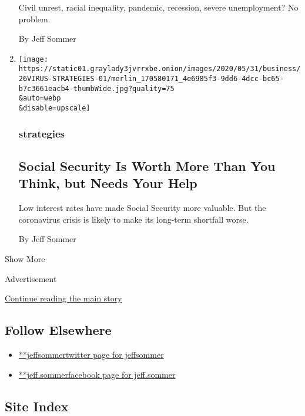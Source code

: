 \begin{enumerate}
  Civil unrest, racial inequality, pandemic, recession, severe
  unemployment? No problem.

  By Jeff Sommer
\item
  \href{/2020/05/29/business/Social-Security-benefits-shortfall-coronavirus.html}{}

  \texttt{[image: https://static01.graylady3jvrrxbe.onion/images/2020/05/31/business/26VIRUS-STRATEGIES-01/merlin\_170580171\_4e6985f3-9dd6-4dcc-bc65-b7c3661eacb4-thumbWide.jpg?quality=75\\\&auto=webp\\\&disable=upscale]}

  \hypertarget{strategies-8}{%
  \subsubsection{strategies}\label{strategies-8}}

  \hypertarget{social-security-is-worth-more-than-you-think-but-needs-your-help}{%
  \subsection{Social Security Is Worth More Than You Think, but Needs
  Your
  Help}\label{social-security-is-worth-more-than-you-think-but-needs-your-help}}

  Low interest rates have made Social Security more valuable. But the
  coronavirus crisis is likely to make its long-term shortfall worse.

  By Jeff Sommer
\end{enumerate}

Show More

Advertisement

\protect\hyperlink{after-mid2}{Continue reading the main story}

\hypertarget{follow-elsewhere}{%
\subsection{Follow Elsewhere}\label{follow-elsewhere}}

\begin{itemize}
\tightlist
\item
  \href{https://twitter.com/jeffsommer}{**jeffsommertwitter page for
  jeffsommer}
\item
  \href{https://www.facebookcorewwwi.onion/jeff.sommer}{**jeff.sommerfacebook
  page for jeff.sommer}
\end{itemize}

\hypertarget{site-index}{%
\subsection{Site Index}\label{site-index}}

